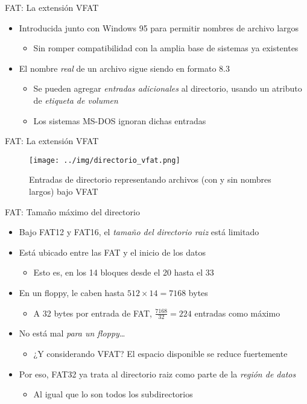 \documentclass[presentation]{beamer}
\begin{document}
\begin{frame}[label={sec:org9100110}]{FAT: La extensión VFAT}
\begin{itemize}
\item Introducida junto con Windows 95 para permitir nombres de archivo largos
\begin{itemize}
\item Sin romper compatibilidad con la amplia base de sistemas ya existentes
\end{itemize}
\item El nombre \emph{real} de un archivo sigue siendo en formato 8.3
\begin{itemize}
\item Se pueden agregar \emph{entradas adicionales} al directorio, usando un
atributo de \emph{etiqueta de volumen}
\item Los sistemas MS-DOS ignoran dichas entradas
\end{itemize}
\end{itemize}
\end{frame}

\begin{frame}[label={sec:org9568012}]{FAT: La extensión VFAT}
\begin{figure}[htbp]
\centering
\texttt{[image: ../img/directorio\_vfat.png]}
\caption{Entradas de directorio representando archivos (con y sin nombres largos) bajo VFAT}
\end{figure}
\end{frame}

\begin{frame}[label={sec:orgeb1b61f}]{FAT: Tamaño máximo del directorio}
\begin{itemize}
\item Bajo FAT12 y FAT16, el \emph{tamaño del directorio raiz} está limitado
\item Está ubicado entre las FAT y el inicio de los datos
\begin{itemize}
\item Esto es, en los 14 bloques desde el 20 hasta el 33
\end{itemize}
\item En un floppy, le caben hasta \(512 \times 14 = 7168\) bytes
\begin{itemize}
\item A 32 bytes por entrada de FAT, \(\frac{7168}{32} = 224\) entradas
como máximo
\end{itemize}
\item No está mal \emph{para un floppy}\ldots{}
\begin{itemize}
\item ¿Y considerando VFAT? El espacio disponible se reduce fuertemente
\end{itemize}
\item Por eso, FAT32 ya trata al directorio raiz como parte de la \emph{región de datos}
\begin{itemize}
\item Al igual que lo son todos los subdirectorios
\end{itemize}
\end{itemize}
\end{frame}
\end{document}
